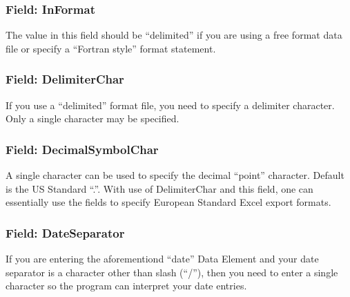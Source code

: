 \subsubsection{Field: InFormat}\label{field-informat}

The value in this field should be ``delimited'' if you are using a free format data file or specify a ``Fortran style'' format statement.

\subsubsection{Field: DelimiterChar}\label{field-delimiterchar}

If you use a ``delimited'' format file, you need to specify a delimiter character. Only a single character may be specified.

\subsubsection{Field: DecimalSymbolChar}\label{field-decimalsymbolchar}

A single character can be used to specify the decimal ``point'' character. Default is the US Standard ``.''. With use of DelimiterChar and this field, one can essentially use the fields to specify European Standard Excel export formats.

\subsubsection{Field: DateSeparator}\label{field-dateseparator}

If you are entering the aforementiond ``date'' Data Element and your date separator is a character other than slash (``/''), then you need to enter a single character so the program can interpret your date entries.

